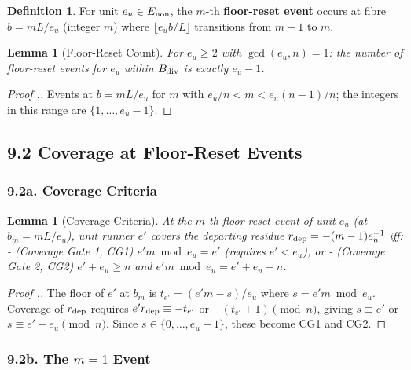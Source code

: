 \documentclass[11pt,a4paper]{article}
\theoremstyle{plain}
\newtheorem{lemma}[theorem]{Lemma}
\theoremstyle{definition}
\newtheorem{definition}[theorem]{Definition}
\theoremstyle{remark}
\begin{document}
\begin{definition}
For unit $e_u \in E_{\rm non}$, the $m$-th \textbf{floor-reset event} occurs at fibre $b = mL/e_u$ (integer $m$) where $\lfloor e_u b/L \rfloor$ transitions from $m-1$ to $m$.

\end{definition}


\begin{lemma}[Floor-Reset Count]
For $e_u \geq 2$ with $\gcd(e_u,n)=1$: the number of floor-reset events for $e_u$ within $B_{\rm div}$ is exactly $e_u - 1$.

\end{lemma}

\begin{proof}[Proof .]
Events at $b = mL/e_u$ for $m$ with $e_u/n < m < e_u(n-1)/n$; the integers in this range are $\{1,\ldots,e_u-1\}$.
\end{proof}


\subsection{9.2 Coverage at Floor-Reset Events}



\subsubsection{9.2a. Coverage Criteria}



\begin{lemma}[Coverage Criteria]
At the $m$-th floor-reset event of unit $e_u$ (at $b_m = mL/e_u$), unit runner $e'$ covers the departing residue $r_{\rm dep} = -(m-1)e_u^{-1}$ iff:
- \textit{(Coverage Gate 1, CG1)} $e' m \bmod e_u = e'$ (requires $e' < e_u$), or
- \textit{(Coverage Gate 2, CG2)} $e' + e_u \geq n$ and $e' m \bmod e_u = e' + e_u - n$.

\end{lemma}

\begin{proof}[Proof .]
The floor of $e'$ at $b_m$ is $t_{e'} = (e'm - s)/e_u$ where $s = e'm \bmod e_u$. Coverage of $r_{\rm dep}$ requires $e' r_{\rm dep} \equiv -t_{e'}$ or $-(t_{e'}+1) \pmod n$, giving $s \equiv e'$ or $s \equiv e' + e_u \pmod n$. Since $s \in \{0,\ldots,e_u-1\}$, these become CG1 and CG2.
\end{proof}


\subsubsection{9.2b. The $m=1$ Event}
\end{document}
